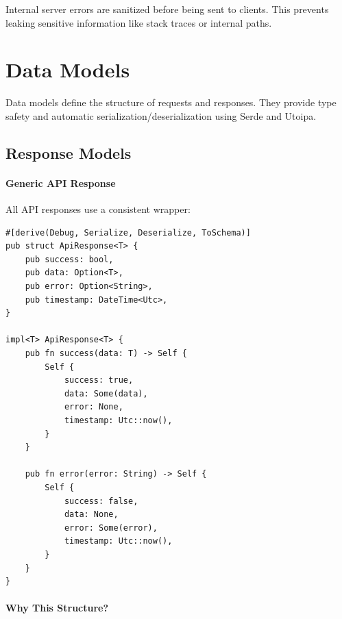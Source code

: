 \begin{infobox}
Internal server errors are sanitized before being sent to clients. This prevents leaking sensitive information like stack traces or internal paths.
\end{infobox}

\section{Data Models}
\label{sec:data-models}

Data models define the structure of requests and responses. They provide type safety and automatic serialization/deserialization using Serde and Utoipa.

\subsection{Response Models}

\paragraph{Generic API Response}

All API responses use a consistent wrapper:

\begin{listing}[htbp]
\caption{Generic API response wrapper}
\label{lst:models-api-response}
\begin{verbatim}
#[derive(Debug, Serialize, Deserialize, ToSchema)]
pub struct ApiResponse<T> {
    pub success: bool,
    pub data: Option<T>,
    pub error: Option<String>,
    pub timestamp: DateTime<Utc>,
}

impl<T> ApiResponse<T> {
    pub fn success(data: T) -> Self {
        Self {
            success: true,
            data: Some(data),
            error: None,
            timestamp: Utc::now(),
        }
    }

    pub fn error(error: String) -> Self {
        Self {
            success: false,
            data: None,
            error: Some(error),
            timestamp: Utc::now(),
        }
    }
}
\end{verbatim}
\end{listing}

\paragraph{Why This Structure?}

